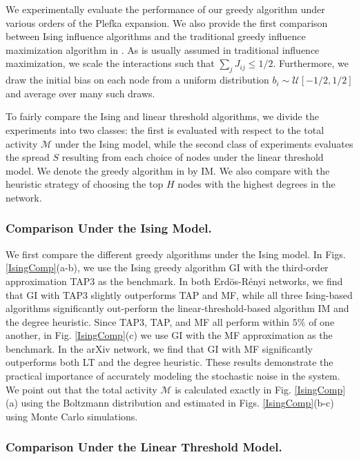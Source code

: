 \documentclass[letterpaper]{article} %
\begin{document}
We experimentally evaluate the performance of our greedy algorithm under various orders of the Plefka expansion. We also provide the first comparison between Ising influence algorithms and the traditional greedy influence maximization algorithm in \cite{Kempe-01}. As is usually assumed in traditional influence maximization, we scale the interactions such that $\sum_j J_{ij} \le 1/2$. Furthermore, we draw the initial bias on each node from a uniform distribution $b_i\sim\mathcal{U}[-1/2,1/2]$ and average over many such draws.

To fairly compare the Ising and linear threshold algorithms, we divide the experiments into two classes: the first is evaluated with respect to the total activity $\mathcal{M}$ under the Ising model, while the second class of experiments evaluates the spread $S$ resulting from each choice of nodes under the linear threshold model. We denote the greedy algorithm in \cite{Kempe-01} by IM. We also compare with the heuristic strategy of choosing the top $H$ nodes with the highest degrees in the network.

\subsubsection{Comparison Under the Ising Model.}

We first compare the different greedy algorithms under the Ising model. In Figs. \ref{IsingComp}(a-b), we use the Ising greedy algorithm GI with the third-order approximation TAP3 as the benchmark. In both Erd\"{o}s-R\'{e}nyi networks, we find that GI with TAP3 slightly outperforms TAP and MF, while all three Ising-based algorithms significantly out-perform the linear-threshold-based algorithm IM and the degree heuristic. Since TAP3, TAP, and MF all perform within $5\%$ of one another, in Fig. \ref{IsingComp}(c) we use GI with the MF approximation as the benchmark. In the arXiv network, we find that GI with MF significantly outperforms both LT and the degree heuristic. These results demonstrate the practical importance of accurately modeling the stochastic noise in the system. We point out that the total activity $\mathcal{M}$ is calculated exactly in Fig. \ref{IsingComp}(a) using the Boltzmann distribution and estimated in Figs. \ref{IsingComp}(b-c) using Monte Carlo simulations.

\subsubsection{Comparison Under the Linear Threshold Model.}
\end{document}
